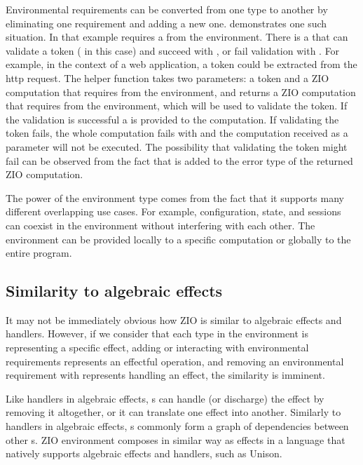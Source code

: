 

Environmental requirements can be converted from one type to another by eliminating one requirement and adding a new one.  demonstrates one such situation. In that example  requires a  from the environment. There is a  that can validate a token ( in this case) and succeed with , or fail validation with . For example, in the context of a web application, a token could be extracted from the http request. The helper function  takes two parameters: a token and a ZIO computation that requires  from the environment, and returns a ZIO computation that requires  from the environment, which will be used to validate the token. If the validation is successful a  is provided to the computation. If validating the token fails, the whole computation fails with  and the computation received as a parameter will not be executed. The possibility that validating the token might fail can be observed from the fact that   is added to the error type of the returned ZIO computation.



The power of the environment type comes from the fact that it supports many different overlapping use cases. For example, configuration, state, and sessions can coexist in the environment without interfering with each other. The environment can be provided locally to a specific computation or globally to the entire program.


\subsection{Similarity to algebraic effects}
It may not be immediately obvious how ZIO is similar to algebraic effects and handlers.
However, if we consider that each type in the environment is representing a specific effect, adding or interacting with environmental requirements represents an effectful operation, and removing an environmental requirement with  represents handling an effect, the similarity is imminent.

Like handlers in algebraic effects, s can handle (or discharge) the effect by removing it altogether, or it can translate one effect into another. Similarly to handlers in algebraic effects, s commonly form a graph of dependencies between other s. ZIO environment composes in similar way as effects in a language that natively supports algebraic effects and handlers, such as Unison.

